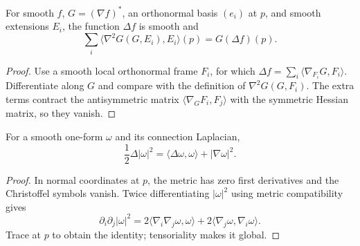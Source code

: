 \begin{lemma}
\label{lem:laplacian-trace-commutation}





For smooth $f$, $G=(\nabla f)^*$, an orthonormal basis $(e_i)$ at $p$,
and smooth extensions $E_i$, the function $\Delta f$ is smooth and
$$\sum_i\langle\nabla^2G(G,E_i),E_i\rangle(p)=G(\Delta f)(p).$$
\end{lemma}
\begin{proof}
\sketch
{}

Use a smooth local orthonormal frame $F_i$, for which
$\Delta f=\sum_i\langle\nabla_{F_i}G,F_i\rangle$. Differentiate along
$G$ and compare with the definition of $\nabla^2G(G,F_i)$. The extra
terms contract the antisymmetric matrix
$\langle\nabla_GF_i,F_j\rangle$ with the symmetric Hessian matrix, so
they vanish.
\end{proof}

\begin{lemma}
\label{lem:laplacian-square-norm-one-form}

For a smooth one-form $\omega$ and its connection Laplacian,
$$\frac12\Delta|\omega|^2
=\langle\Delta\omega,\omega\rangle+|\nabla\omega|^2.$$
\end{lemma}
\begin{proof}
\sketch
{}
In normal coordinates at $p$, the metric has zero first derivatives and
the Christoffel symbols vanish. Twice differentiating
$|\omega|^2$ using metric compatibility gives
$$\partial_i\partial_j|\omega|^2
=2\langle\nabla_i\nabla_j\omega,\omega\rangle
+2\langle\nabla_j\omega,\nabla_i\omega\rangle.$$
Trace at $p$ to obtain the identity; tensoriality makes it global.
\end{proof}


